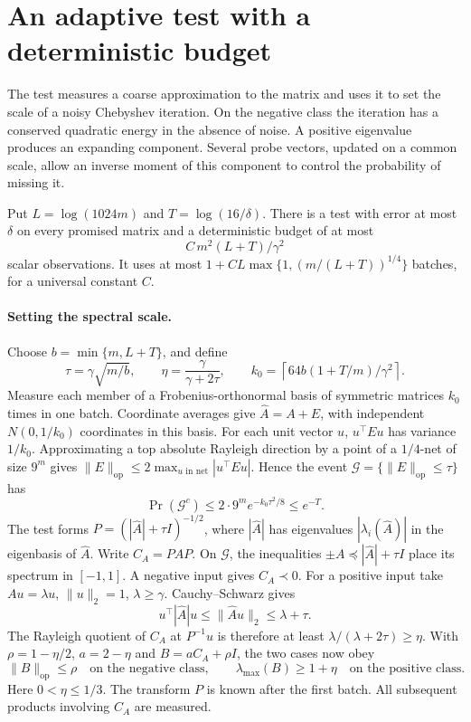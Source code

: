\section{An adaptive test with a deterministic budget}\label{sec:algorithm}

The test measures a coarse approximation to the matrix and uses it to set the scale of a noisy Chebyshev iteration. On the negative class the iteration has a conserved quadratic energy in the absence of noise. A positive eigenvalue produces an expanding component. Several probe vectors, updated on a common scale, allow an inverse moment of this component to control the probability of missing it.

\begin{proposition}\label{prop:adaptive-algorithm}
Put \(L=\log(1024m)\) and \(T=\log(16/\delta)\). There is a test with error at most \(\delta\) on every promised matrix and a deterministic budget of at most
\[
 C\,m^2(L+T)/\gamma^2
\]
scalar observations. It uses at most \(1+C L\max\{1,(m/(L+T))^{1/4}\}\) batches, for a universal constant \(C\).
\end{proposition}

\paragraph{Setting the spectral scale.}
Choose \(b=\min\{m,L+T\}\), and define
\[
 \tau=\gamma\sqrt{m/b},\qquad \eta=\frac{\gamma}{\gamma+2\tau},
 \qquad k_0=\left\lceil 64b(1+T/m)/\gamma^2\right\rceil .
\]
Measure each member of a Frobenius-orthonormal basis of symmetric matrices \(k_0\) times in one batch. Coordinate averages give \(\widehat A=A+E\), with independent \(N(0,1/k_0)\) coordinates in this basis. For each unit vector \(u\), \(u^\top E u\) has variance \(1/k_0\). Approximating a top absolute Rayleigh direction by a point of a \(1/4\)-net of size \(9^m\) gives \(\|E\|_{\mathrm{op}}\le 2\max_{u\text{ in net}}|u^\top E u|\). Hence the event \(\mathcal G=\{\|E\|_{\mathrm{op}}\le\tau\}\) has
\[
 \Pr(\mathcal G^c)\le 2\cdot 9^m e^{-k_0\tau^2/8}\le e^{-T}.
\]
The test forms \(P=(|\widehat A|+\tau I)^{-1/2}\), where \(|\widehat A|\) has eigenvalues \(|\lambda_i(\widehat A)|\) in the eigenbasis of \(\widehat A\). Write \(C_A=PAP\). On \(\mathcal G\), the inequalities \(\pm A\preceq |\widehat A|+\tau I\) place its spectrum in \([-1,1]\). A negative input gives \(C_A\prec0\). For a positive input take \(Au=\lambda u\), \(\|u\|_2=1\), \(\lambda\ge\gamma\). Cauchy--Schwarz gives
\[
 u^\top|\widehat A|u\le\|\widehat A u\|_2\le\lambda+\tau .
\]
The Rayleigh quotient of \(C_A\) at \(P^{-1}u\) is therefore at least \(\lambda/(\lambda+2\tau)\ge\eta\). With \(\rho=1-\eta/2\), \(a=2-\eta\) and \(B=a C_A+\rho I\), the two cases now obey
\[
 \|B\|_{\mathrm{op}}\le\rho \quad\text{on the negative class},\qquad
 \lambda_{\max}(B)\ge 1+\eta \quad\text{on the positive class}.
\]
Here \(0<\eta\le 1/3\). The transform \(P\) is known after the first batch. All subsequent products involving \(C_A\) are measured.

